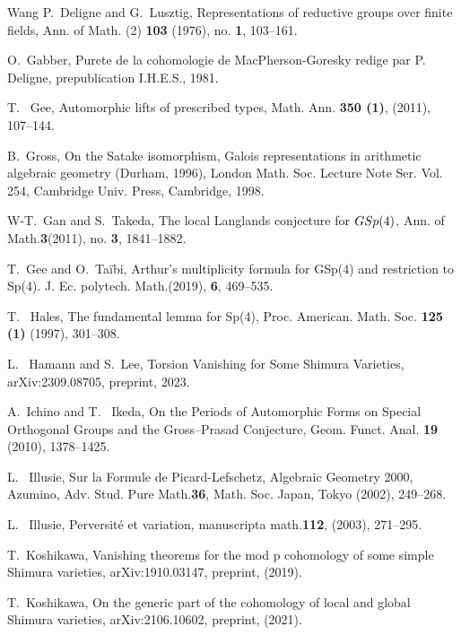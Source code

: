 \documentclass[10pt]{amsart}
\numberwithin{equation}{section}
\theoremstyle{definition}
\begin{document}
\begin{thebibliography}{Wang}
P.~Deligne and G.~Lusztig, Representations of reductive groups over finite fields, 
{Ann. of Math. (2)}  {\bf 103} (1976), no. {\bf1}, 103--161. 

O.~Gabber, Purete de la cohomologie de MacPherson-Goresky redige par P. Deligne, prepublication I.H.E.S., 1981.

T.~ Gee, {Automorphic lifts of prescribed types},  {Math. Ann.} {\bf 350 (1)}, (2011), 107--144.

B.~Gross, {On the Satake isomorphism}, {Galois representations in arithmetic algebraic geometry (Durham, 1996)}, {London Math. Soc. Lecture Note Ser.  Vol. 254}, {Cambridge Univ. Press, Cambridge}, {1998}.

W-T.~Gan and S.~Takeda, The local Langlands conjecture for {${\rm GSp}(4)$},
{Ann. of Math.}{\bf 3}(2011), no. {\bf 3}, 1841--1882.

T.~Gee and O.~Ta\"ibi, Arthur's multiplicity formula for GSp(4) and restriction to Sp(4).
{J. Ec. polytech. Math.}(2019), {\bf6}, 469--535. 

T.~ Hales, {The fundamental lemma for Sp(4)},  {Proc. American. Math. Soc. } {\bf 125 (1)} (1997), 301--308.

L.~ Hamann and S.~Lee, {Torsion Vanishing for Some Shimura Varieties}, {arXiv:2309.08705}, preprint, 2023.

A.~Ichino and T.~ Ikeda,  {On the Periods of Automorphic Forms on Special Orthogonal Groups and the Gross--Prasad Conjecture}, {Geom. Funct. Anal. }{\bf19} (2010), 1378--1425.

L.~ Illusie, {Sur la Formule de Picard-Lefschetz},  {Algebraic Geometry 2000, Azumino}, { Adv. Stud. Pure Math.}{\bf 36}, {Math. Soc. Japan, Tokyo (2002)}, 249--268. 

L.~ Illusie, {Perversité et variation},  {manuscripta math.}{\bf 112},  {(2003)}, 271--295. 

T.~Koshikawa, {Vanishing theorems for the mod p cohomology of some simple Shimura varieties}, {arXiv:1910.03147}, preprint, (2019).

T.~Koshikawa, {On the generic part of the cohomology of local and global Shimura varieties}, {arXiv:2106.10602}, preprint, (2021).


\end{thebibliography}
\end{document}

